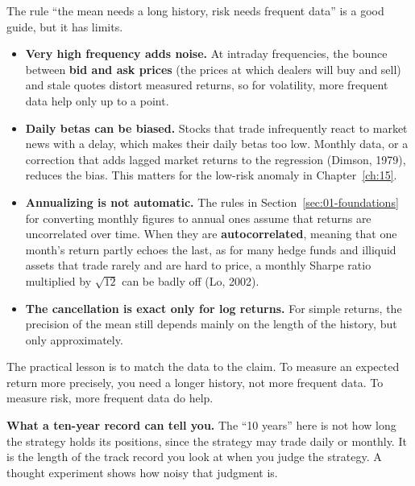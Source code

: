 \begin{technote}
The rule ``the mean needs a long history, risk needs frequent data'' is a good guide, but it has limits.
\begin{itemize}
  \item \textbf{Very high frequency adds noise.} At intraday frequencies, the bounce between \textbf{bid and ask prices} (the prices at which dealers will buy and sell) and stale quotes distort measured returns, so for volatility, more frequent data help only up to a point.
  \item \textbf{Daily betas can be biased.} Stocks that trade infrequently react to market news with a delay, which makes their daily betas too low. Monthly data, or a correction that adds lagged market returns to the regression (Dimson, 1979), reduces the bias. This matters for the low-risk anomaly in Chapter~\ref{ch:15}.
  \item \textbf{Annualizing is not automatic.} The rules in Section~\ref{sec:01-foundations} for converting monthly figures to annual ones assume that returns are uncorrelated over time. When they are \textbf{autocorrelated}, meaning that one month's return partly echoes the last, as for many hedge funds and illiquid assets that trade rarely and are hard to price, a monthly Sharpe ratio multiplied by $\sqrt{12}$ can be badly off (Lo, 2002).
  \item \textbf{The cancellation is exact only for log returns.} For simple returns, the precision of the mean still depends mainly on the length of the history, but only approximately.
\end{itemize}
\end{technote}

The practical lesson is to match the data to the claim. To measure an expected return more precisely, you need a longer history, not more frequent data. To measure risk, more frequent data do help.

\textbf{What a ten-year record can tell you.} The ``10 years'' here is not how long the strategy holds its positions, since the strategy may trade daily or monthly. It is the length of the track record you look at when you judge the strategy. A thought experiment shows how noisy that judgment is.

